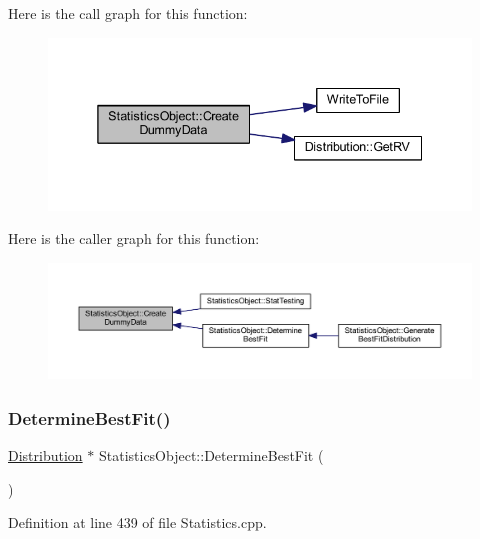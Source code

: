 Here is the call graph for this function\+:
\nopagebreak
\begin{figure}[H]
\begin{center}
\leavevmode
\includegraphics[width=338pt]{class_statistics_object_a8177bcf97b01750d125852b888e11323_cgraph}
\end{center}
\end{figure}
Here is the caller graph for this function\+:
\nopagebreak
\begin{figure}[H]
\begin{center}
\leavevmode
\includegraphics[width=350pt]{class_statistics_object_a8177bcf97b01750d125852b888e11323_icgraph}
\end{center}
\end{figure}
\mbox{\label{class_statistics_object_a13305945c9536243f926b61d554c2dd4}} 
\subsubsection{\texorpdfstring{Determine\+Best\+Fit()}{DetermineBestFit()}}
{\footnotesize\ttfamily \hyperlink{class_distribution}{Distribution} $\ast$ Statistics\+Object\+::\+Determine\+Best\+Fit (\begin{DoxyParamCaption}{ }\end{DoxyParamCaption})}



Definition at line 439 of file Statistics.\+cpp.

